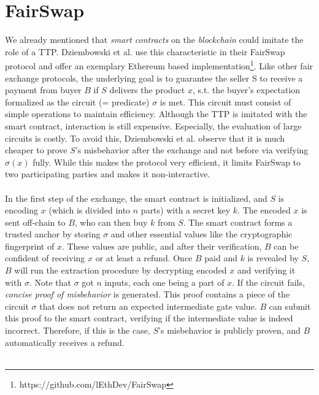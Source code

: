 \documentclass{cacthesis}
\newcounter{protocol}
\begin{document}
        \section{FairSwap}
        \label{sec:FairSwap}
        We already mentioned that \textit{smart contracts} on the \textit{blockchain} could imitate the role of a TTP. Dziembowski et al. use this characteristic in their FairSwap protocol \cite{10.1145/3243734.3243857} and offer an exemplary Ethereum based implementation\footnote{https://github.com/lEthDev/FairSwap}. Like other fair exchange protocols, the underlying goal is to guarantee the seller S to receive a payment from buyer $B$ if $S$ delivers the product $x$, s.t. the buyer's expectation formalized as the circuit (= predicate) $\sigma$ is met. This circuit must consist of simple operations to maintain efficiency. Although the TTP is imitated with the smart contract, interaction is still expensive. Especially, the evaluation of large circuits is costly. To avoid this, Dziembowski et al. observe that it is much cheaper to prove $S$'s misbehavior after the exchange and not before via verifying $\sigma(x)$ fully. While this makes the protocol very efficient, it limits FairSwap to two participating parties and makes it non-interactive. \\\\
        In the first step of the exchange, the smart contract is initialized, and $S$ is encoding $x$ (which is divided into $n$ parts) with a secret key $k$. The encoded $x$ is sent off-chain to $B$, who can then buy $k$ from $S$. The smart contract forms a trusted anchor by storing $\sigma$ and other essential values like the cryptographic fingerprint of $x$. These values are public, and after their verification, $B$ can be confident of receiving $x$ or at least a refund. Once $B$ paid and $k$ is revealed by $S$, $B$ will run the extraction procedure by decrypting encoded $x$ and verifying it with $\sigma$. Note that $\sigma$ got $n$ inputs, each one being a part of $x$. If the circuit fails, \textit{concise proof of misbehavior} is generated. This proof contains a piece of the circuit $\sigma$ that does not return an expected intermediate gate value. $B$ can submit this proof to the smart contract, verifying if the intermediate value is indeed incorrect. Therefore, if this is the case, $S$'s misbehavior is publicly proven, and $B$ automatically receives a refund. \\\\
\end{document}
